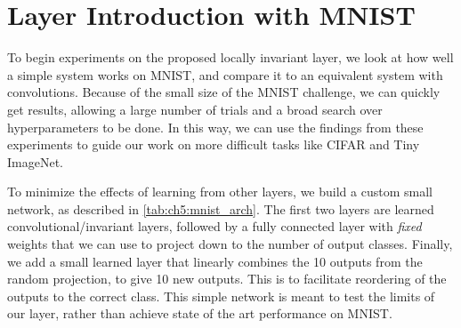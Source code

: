
\section{Layer Introduction with MNIST}\label{sec:ch5:mnist}



To begin experiments on the proposed locally invariant layer, we look at how
well a simple system works on MNIST, and compare it to an equivalent system with
convolutions. Because of the small size of the MNIST challenge, we can quickly
get results, allowing a large number of trials and a broad search over
hyperparameters to be done. In this way, we can use the findings from these
experiments to guide our work on more difficult tasks like CIFAR and Tiny
ImageNet.

To minimize the effects of learning from other layers, we build a
custom small network, as described in \autoref{tab:ch5:mnist_arch}. 
The first two layers are learned convolutional/invariant layers, followed by
a fully connected layer with \emph{fixed} weights that we can use to project down to
the number of output classes. Finally, we add a small learned layer that
linearly combines the 10 outputs from the random projection, to give 10 new
outputs. This is to facilitate reordering of the outputs to the correct class.
This simple network is meant to test the limits of our layer, rather than
achieve state of the art performance on MNIST.

